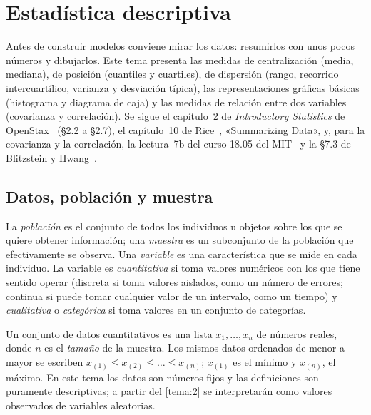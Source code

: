 \chapter{Estadística descriptiva}
\label{tema:1}

Antes de construir modelos conviene mirar los datos: resumirlos con unos pocos números y dibujarlos. Este tema presenta las medidas de centralización (media, mediana), de posición (cuantiles y cuartiles), de dispersión (rango, recorrido intercuartílico, varianza y desviación típica), las representaciones gráficas básicas (histograma y diagrama de caja) y las medidas de relación entre dos variables (covarianza y correlación). Se sigue el capítulo~2 de \emph{Introductory Statistics} de OpenStax~\cite{openstax} (§2.2 a §2.7), el capítulo~10 de Rice~\cite{rice}, «Summarizing Data», y, para la covarianza y la correlación, la lectura~7b del curso 18.05 del MIT~\cite{mit1805} y la §7.3 de Blitzstein y Hwang~\cite{bh}.

\section{Datos, población y muestra}

\begin{definicion}\label{def:t1-poblacion}
La \emph{población} es el conjunto de todos los individuos u objetos sobre los que se quiere obtener información; una \emph{muestra} es un subconjunto de la población que efectivamente se observa. Una \emph{variable} es una característica que se mide en cada individuo. La variable es \emph{cuantitativa} si toma valores numéricos con los que tiene sentido operar (discreta si toma valores aislados, como un número de errores; continua si puede tomar cualquier valor de un intervalo, como un tiempo) y \emph{cualitativa} o \emph{categórica} si toma valores en un conjunto de categorías.
\end{definicion}

Un conjunto de datos cuantitativos es una lista $x_1,\dots,x_n$ de números reales, donde $n$ es el \emph{tamaño} de la muestra. Los mismos datos ordenados de menor a mayor se escriben $x_{(1)}\le x_{(2)}\le\dots\le x_{(n)}$; $x_{(1)}$ es el mínimo y $x_{(n)}$, el máximo. En este tema los datos son números fijos y las definiciones son puramente descriptivas; a partir del \cref{tema:2} se interpretarán como valores observados de variables aleatorias.

